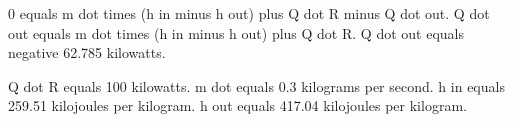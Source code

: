 0 equals m dot times (h in minus h out) plus Q dot R minus Q dot out.  
Q dot out equals m dot times (h in minus h out) plus Q dot R.  
Q dot out equals negative 62.785 kilowatts.  

Q dot R equals 100 kilowatts.  
m dot equals 0.3 kilograms per second.  
h in equals 259.51 kilojoules per kilogram.  
h out equals 417.04 kilojoules per kilogram.